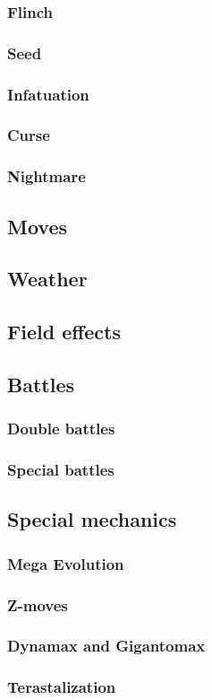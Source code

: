 \subsubsection{Flinch}
\subsubsection{Seed}
\subsubsection{Infatuation}
\subsubsection{Curse}
\subsubsection{Nightmare}
\subsection{Moves}
\subsection{Weather}
\subsection{Field effects}
\subsection{Battles}
\subsubsection{Double battles}
\subsubsection{Special battles}
\subsection{Special mechanics}
\subsubsection{Mega Evolution}
\subsubsection{Z-moves}
\subsubsection{Dynamax and Gigantomax}
\subsubsection{Terastalization}
